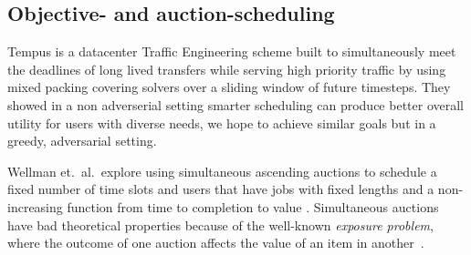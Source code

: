 \subsection{Objective- and auction-scheduling}
Tempus \cite{tempus14} is a datacenter Traffic Engineering scheme built to simultaneously meet the deadlines of long lived transfers while serving high priority traffic by using mixed packing covering solvers over a sliding window of future timesteps.
They showed in a non adverserial setting smarter scheduling can produce better overall utility for users with diverse needs, we hope to achieve similar goals but in a greedy, adversarial setting.

Wellman et.~al.~explore using simultaneous ascending auctions to schedule a fixed number of time slots and users that have jobs with fixed lengths and a non-increasing function from time to completion to value \cite{wellman01, wellman05}. Simultaneous auctions have bad theoretical properties because of the well-known \emph{exposure problem}, where the outcome of one auction affects the value of an item in another~\cite{milgrom00, englmaier06}.






















